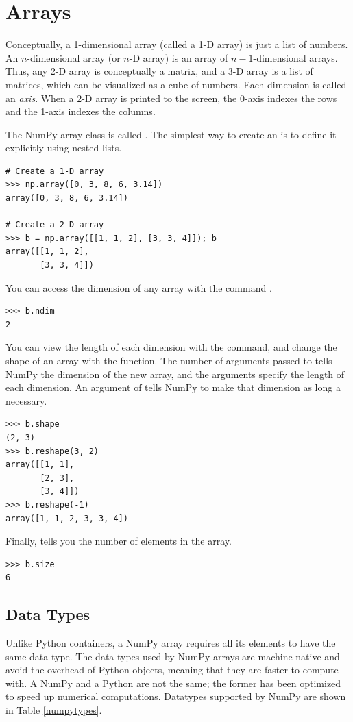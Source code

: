 \section*{Arrays}

Conceptually, a 1-dimensional array (called a 1-D array) is just a list of numbers. An $n$-dimensional array (or $n$-D array) is an array of $n-1$-dimensional arrays. Thus, any 2-D array is conceptually a matrix, and a 3-D array is a list of matrices, which can be visualized as a cube of numbers. Each dimension is called an \emph{axis}. When a 2-D array is printed to the screen, the 0-axis indexes the rows and the 1-axis indexes the columns.

The NumPy array class is called . The simplest way to create an  is
to define it explicitly using nested lists.
\begin{lstlisting}
# Create a 1-D array
>>> np.array([0, 3, 8, 6, 3.14])
array([0, 3, 8, 6, 3.14]) 

# Create a 2-D array
>>> b = np.array([[1, 1, 2], [3, 3, 4]]); b
array([[1, 1, 2],
       [3, 3, 4]])
\end{lstlisting} 

You can access the dimension of any array with the command .
\begin{lstlisting}
>>> b.ndim
2
\end{lstlisting}

You can view the length of each dimension with the  command, and change the shape of an array with the  function. The number of arguments passed to  tells NumPy the dimension of the new array, and the arguments specify the length of each dimension. An argument of  tells NumPy to make that dimension as long a necessary.
\begin{lstlisting}
>>> b.shape
(2, 3)
>>> b.reshape(3, 2)
array([[1, 1],
       [2, 3],
       [3, 4]])
>>> b.reshape(-1)
array([1, 1, 2, 3, 3, 4])
\end{lstlisting}

Finally,  tells you the number of elements in the array.
\begin{lstlisting}
>>> b.size
6
\end{lstlisting}

\subsection*{Data Types}
Unlike Python containers, a NumPy array requires all its elements to have the same data type. The data types used by NumPy arrays are machine-native and avoid the overhead of Python objects, meaning that they are faster to compute with. A NumPy  and a Python  are not the same; the former has been optimized to speed up numerical computations. Datatypes supported by NumPy are shown in Table \ref{numpytypes}.

